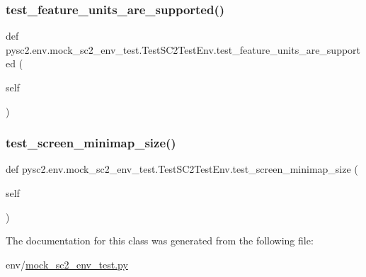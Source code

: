 \subsubsection{\texorpdfstring{test\+\_\+feature\+\_\+units\+\_\+are\+\_\+supported()}{test\_feature\_units\_are\_supported()}}
{\footnotesize\ttfamily def pysc2.\+env.\+mock\+\_\+sc2\+\_\+env\+\_\+test.\+Test\+S\+C2\+Test\+Env.\+test\+\_\+feature\+\_\+units\+\_\+are\+\_\+supported (\begin{DoxyParamCaption}\item[{}]{self }\end{DoxyParamCaption})}

\mbox{\label{classpysc2_1_1env_1_1mock__sc2__env__test_1_1_test_s_c2_test_env_aac0359cf409eb577dc65434e8c4e632d}} 
\subsubsection{\texorpdfstring{test\+\_\+screen\+\_\+minimap\+\_\+size()}{test\_screen\_minimap\_size()}}
{\footnotesize\ttfamily def pysc2.\+env.\+mock\+\_\+sc2\+\_\+env\+\_\+test.\+Test\+S\+C2\+Test\+Env.\+test\+\_\+screen\+\_\+minimap\+\_\+size (\begin{DoxyParamCaption}\item[{}]{self }\end{DoxyParamCaption})}



The documentation for this class was generated from the following file\+:\begin{DoxyCompactItemize}
\item 
env/\mbox{\hyperlink{mock__sc2__env__test_8py}{mock\+\_\+sc2\+\_\+env\+\_\+test.\+py}}\end{DoxyCompactItemize}
